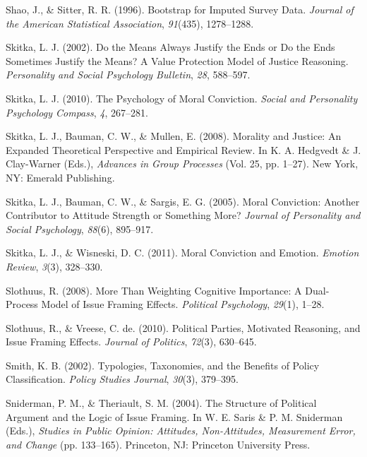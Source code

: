 \documentclass[12pt,econ]{sources/authesis}
\begin{document}
\leavevmode\hypertarget{ref-shao_1996_bootstrap}{}%
Shao, J., \& Sitter, R. R. (1996). Bootstrap for Imputed Survey Data. \emph{Journal of the American Statistical Association}, \emph{91}(435), 1278--1288.

\leavevmode\hypertarget{ref-skitka_2002_means}{}%
Skitka, L. J. (2002). Do the Means Always Justify the Ends or Do the Ends Sometimes Justify the Means? A Value Protection Model of Justice Reasoning. \emph{Personality and Social Psychology Bulletin}, \emph{28}, 588--597.

\leavevmode\hypertarget{ref-skitka_psychology_2010}{}%
Skitka, L. J. (2010). The Psychology of Moral Conviction. \emph{Social and Personality Psychology Compass}, \emph{4}, 267--281.

\leavevmode\hypertarget{ref-skitka_2008_morality}{}%
Skitka, L. J., Bauman, C. W., \& Mullen, E. (2008). Morality and Justice: An Expanded Theoretical Perspective and Empirical Review. In K. A. Hedgvedt \& J. Clay-Warner (Eds.), \emph{Advances in Group Processes} (Vol. 25, pp. 1--27). New York, NY: Emerald Publishing.

\leavevmode\hypertarget{ref-skitka_moral_2005}{}%
Skitka, L. J., Bauman, C. W., \& Sargis, E. G. (2005). Moral Conviction: Another Contributor to Attitude Strength or Something More? \emph{Journal of Personality and Social Psychology}, \emph{88}(6), 895--917.

\leavevmode\hypertarget{ref-skitka_moral_2011}{}%
Skitka, L. J., \& Wisneski, D. C. (2011). Moral Conviction and Emotion. \emph{Emotion Review}, \emph{3}(3), 328--330.

\leavevmode\hypertarget{ref-slothuus_more_2008}{}%
Slothuus, R. (2008). More Than Weighting Cognitive Importance: A Dual-Process Model of Issue Framing Effects. \emph{Political Psychology}, \emph{29}(1), 1--28.

\leavevmode\hypertarget{ref-slothuus_political_2010}{}%
Slothuus, R., \& Vreese, C. de. (2010). Political Parties, Motivated Reasoning, and Issue Framing Effects. \emph{Journal of Politics}, \emph{72}(3), 630--645.

\leavevmode\hypertarget{ref-smith_typologies_2002}{}%
Smith, K. B. (2002). Typologies, Taxonomies, and the Benefits of Policy Classification. \emph{Policy Studies Journal}, \emph{30}(3), 379--395.

\leavevmode\hypertarget{ref-sniderman_structure_2004}{}%
Sniderman, P. M., \& Theriault, S. M. (2004). The Structure of Political Argument and the Logic of Issue Framing. In W. E. Saris \& P. M. Sniderman (Eds.), \emph{Studies in Public Opinion: Attitudes, Non-Attitudes, Measurement Error, and Change} (pp. 133--165). Princeton, NJ: Princeton University Press.
\end{document}
